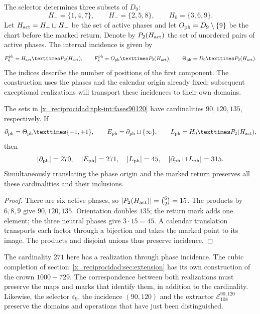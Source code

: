 The selector determines three subsets of \(D_9\):
\[
 H_+=\{1,4,7\},\qquad H_-=\{2,5,8\},\qquad H_0=\{3,6,9\}.
\]
Let \(H_{\rm act}=H_+\sqcup H_-\) be the set of active phases and
let \(O_{\rm ph}=D_9\setminus\{9\}\) be the chart before the marked
return. Denote by \(P_2(H_{\rm act})\) the set of
unordered pairs of active phases. The internal incidence is given by
\begin{equation}
 \mathcal F^{\rm ph}_6=H_{\rm act}\times P_2(H_{\rm act}),\qquad
 \mathcal F^{\rm ph}_8=O_{\rm ph}\times P_2(H_{\rm act}),\qquad
 \Theta_{\rm ph}=D_9\times P_2(H_{\rm act}).
 \label{x_reciprocidad:tpk-int:fases90120}
\end{equation}
The indices describe the number of positions of the first component.
The construction uses the phases and the calendar origin already fixed;
subsequent exceptional realizations will transport these
incidences to their own domains.

\begin{proposition}
\label{x_reciprocidad:tpk-int:cardinales}
The sets in \eqref{x_reciprocidad:tpk-int:fases90120} have cardinalities
\(90,120,135\), respectively. If
\[
 \partial_{\rm ph}=\Theta_{\rm ph}\times\{-1,+1\},\qquad
 E_{\rm ph}=\partial_{\rm ph}\sqcup\{\infty\},\qquad
 L_{\rm ph}=H_0\times P_2(H_{\rm act}),
\]
then
\[
 |\partial_{\rm ph}|=270,\quad |E_{\rm ph}|=271,\quad
 |L_{\rm ph}|=45,\quad
 |\partial_{\rm ph}\sqcup L_{\rm ph}|=315.
\]
Simultaneously translating the phase origin and the marked return preserves
all these cardinalities and their inclusions.
\end{proposition}
\begin{proof}
There are six active phases, so
\(|P_2(H_{\rm act})|=\binom62=15\). The products by
\(6,8,9\) give \(90,120,135\). Orientation doubles \(135\);
the return mark adds one element; the three neutral phases give
\(3\cdot15=45\). A calendar translation transports each
factor through a bijection and takes the marked point to its image. The
products and disjoint unions thus preserve incidence.
\end{proof}

The cardinality \(271\) here has a realization through phase
incidence. The cubic completion of section~\ref{x_reciprocidad:sec:extension} has
its own construction of the crown \(1000-729\). The correspondence
between both realizations must preserve the maps and marks that
identify them, in addition to the cardinality. Likewise, the selector
\(\varepsilon_9\), the incidence \((90,120)\) and the extractor
\(\mathcal E_{108}^{90,120}\) preserve the domains and operations
that have just been distinguished.

